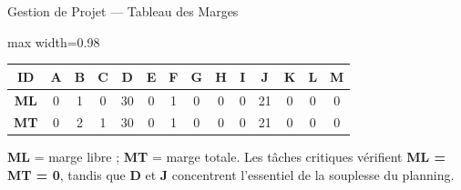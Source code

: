 \begin{frame}{Gestion de Projet --- Tableau des Marges}
    \centering
    \scriptsize
    \renewcommand{\arraystretch}{1.28}
    \setlength{\tabcolsep}{4.2pt}
    \begin{adjustbox}{max width=0.98\textwidth}
    \begin{tabular}{|c|*{13}{c|}}
        \hline
        \textbf{ID} & \textbf{A} & \textbf{B} & \textbf{C} & \textbf{D} & \textbf{E} & \textbf{F} & \textbf{G} & \textbf{H} & \textbf{I} & \textbf{J} & \textbf{K} & \textbf{L} & \textbf{M} \\ \hline
        \textbf{ML} & 0 & 1 & 0 & 30 & 0 & 1 & 0 & 0 & 0 & 21 & 0 & 0 & 0 \\ \hline
        \textbf{MT} & 0 & 2 & 1 & 30 & 0 & 1 & 0 & 0 & 0 & 21 & 0 & 0 & 0 \\ \hline
    \end{tabular}
    \end{adjustbox}
    \captionsetup{type=table}

    \vspace{0.2cm}
    \tiny
    \textbf{ML} = marge libre ; \textbf{MT} = marge totale. Les tâches critiques vérifient \textbf{ML = MT = 0}, tandis que \textbf{D} et \textbf{J} concentrent l'essentiel de la souplesse du planning.
\end{frame}

